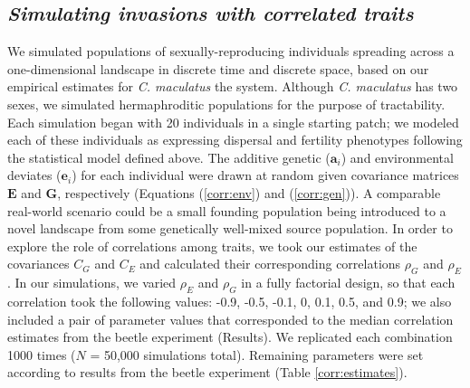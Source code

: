 \subsection{\textit{Simulating invasions with correlated traits}}

We simulated populations of sexually-reproducing individuals spreading across a one-dimensional landscape in discrete time and discrete space, based on our empirical estimates for \textit{C. maculatus} the system. Although \textit{C. maculatus} has two sexes, we simulated hermaphroditic populations for the purpose of tractability. Each simulation began with 20 individuals in a single starting patch; we modeled each of these individuals as expressing dispersal and fertility phenotypes following the statistical model defined above. The additive genetic ($\bm{a}_i$) and environmental deviates ($\bm{e}_i$) for each individual were drawn at random given covariance matrices $\bm{E}$ and $\bm{G}$, respectively (Equations (\ref{corr:env}) and (\ref{corr:gen})). A comparable real-world scenario could be a small founding population being introduced to a novel landscape from some genetically well-mixed source population. In order to explore the role of correlations among traits, we took our estimates of the covariances $C_{G}$ and $C_{E}$ and calculated their corresponding correlations $\rho_{G}$ and $\rho_{E}$ . In our simulations, we varied $\rho_{E}$ and $\rho_{G}$ in a fully factorial design, so that each correlation took the following values: -0.9, -0.5, -0.1, 0, 0.1, 0.5, and 0.9; we also included a pair of parameter values that corresponded to the median correlation estimates from the beetle experiment (Results). %
We replicated each combination 1000 times ($N$ = 50,000 simulations total). Remaining parameters were set according to results from the beetle experiment (Table \ref{corr:estimates}).

